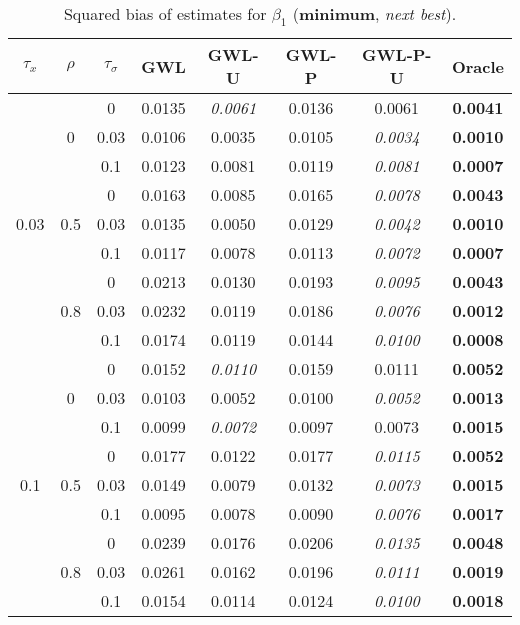 \documentclass[authoryear, review, 11pt]{elsarticle}
\begin{document}
\begin{table}[ht]
\begin{center}
\begin{tabular}{ccc | ccccc}
$\tau_x$ & $\rho$ & $\tau_\sigma$ &  GWL & GWL-U & GWL-P & GWL-P-U & Oracle \\ 
  \hline
\multirow{9}{*}{0.03} & \multirow{3}{*}{0} & 0 & 0.0135 & \emph{0.0061} & 0.0136 & 0.0061 & \textbf{0.0041} \\ 
 &  & 0.03 &   0.0106 & 0.0035 & 0.0105 & \emph{0.0034} & \textbf{0.0010} \\ 
 &  & 0.1 &   0.0123 & 0.0081 & 0.0119 & \emph{0.0081} & \textbf{0.0007} \\ \cline{2-8}
 & \multirow{3}{*}{0.5} & 0 &   0.0163 & 0.0085 & 0.0165 & \emph{0.0078} & \textbf{0.0043} \\ 
 &  & 0.03 &   0.0135 & 0.0050 & 0.0129 & \emph{0.0042} & \textbf{0.0010} \\ 
 &  & 0.1 &   0.0117 & 0.0078 & 0.0113 & \emph{0.0072} & \textbf{0.0007} \\ \cline{2-8}
 & \multirow{3}{*}{0.8} & 0 &   0.0213 & 0.0130 & 0.0193 & \emph{0.0095} & \textbf{0.0043} \\ 
 &  & 0.03 &   0.0232 & 0.0119 & 0.0186 & \emph{0.0076} & \textbf{0.0012} \\ 
 &  & 0.1 &   0.0174 & 0.0119 & 0.0144 & \emph{0.0100} & \textbf{0.0008} \\ \cline{1-8}
\multirow{9}{*}{0.1} & \multirow{3}{*}{0} & 0 &   0.0152 & \emph{0.0110} & 0.0159 & 0.0111 & \textbf{0.0052} \\ 
 &  & 0.03 &   0.0103 & 0.0052 & 0.0100 & \emph{0.0052} & \textbf{0.0013} \\ 
 &  & 0.1 &   0.0099 & \emph{0.0072} & 0.0097 & 0.0073 & \textbf{0.0015} \\ \cline{2-8}
 & \multirow{3}{*}{0.5} & 0 &   0.0177 & 0.0122 & 0.0177 & \emph{0.0115} & \textbf{0.0052} \\ 
 &  & 0.03 &   0.0149 & 0.0079 & 0.0132 & \emph{0.0073} & \textbf{0.0015} \\ 
 &  & 0.1 &   0.0095 & 0.0078 & 0.0090 & \emph{0.0076} & \textbf{0.0017} \\ \cline{2-8}
 & \multirow{3}{*}{0.8} & 0 &   0.0239 & 0.0176 & 0.0206 & \emph{0.0135} & \textbf{0.0048} \\ 
 &  & 0.03 &   0.0261 & 0.0162 & 0.0196 & \emph{0.0111} & \textbf{0.0019} \\ 
 &  & 0.1 &   0.0154 & 0.0114 & 0.0124 & \emph{0.0100} & \textbf{0.0018} \\ 
  \end{tabular}
\caption{Squared bias of estimates for $\beta_1$ (\textbf{minimum}, \emph{next best}).\label{bias}}
\end{center}
\end{table}
\end{document}
